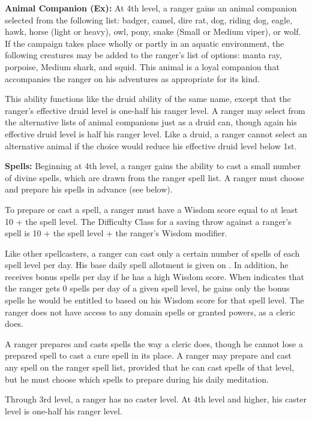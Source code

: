 \textbf{Animal Companion (Ex):} At 4th level, a ranger gains an animal companion selected from the following list: badger, camel, dire rat, dog, riding dog, eagle, hawk, horse (light or heavy), owl, pony, snake (Small or Medium viper), or wolf. If the campaign takes place wholly or partly in an aquatic environment, the following creatures may be added to the ranger's list of options: manta ray, porpoise, Medium shark, and squid. This animal is a loyal companion that accompanies the ranger on his adventures as appropriate for its kind.

This ability functions like the druid ability of the same name, except that the ranger's effective druid level is one-half his ranger level. A ranger may select from the alternative lists of animal companions just as a druid can, though again his effective druid level is half his ranger level. Like a druid, a ranger cannot select an alternative animal if the choice would reduce his effective druid level below 1st.

\textbf{Spells:} Beginning at 4th level, a ranger gains the ability to cast a small number of divine spells, which are drawn from the ranger spell list. A ranger must choose and prepare his spells in advance (see below).

To prepare or cast a spell, a ranger must have a Wisdom score equal to at least 10 + the spell level. The Difficulty Class for a saving throw against a ranger's spell is 10 + the spell level + the ranger's Wisdom modifier.

Like other spellcasters, a ranger can cast only a certain number of spells of each spell level per day. His base daily spell allotment is given on . In addition, he receives bonus spells per day if he has a high Wisdom score. When  indicates that the ranger gets 0 spells per day of a given spell level, he gains only the bonus spells he would be entitled to based on his Wisdom score for that spell level. The ranger does not have access to any domain spells or granted powers, as a cleric does.

A ranger prepares and casts spells the way a cleric does, though he cannot lose a prepared spell to cast a cure spell in its place. A ranger may prepare and cast any spell on the ranger spell list, provided that he can cast spells of that level, but he must choose which spells to prepare during his daily meditation.

Through 3rd level, a ranger has no caster level. At 4th level and higher, his caster level is one-half his ranger level.

